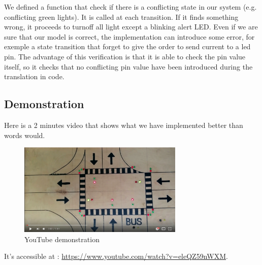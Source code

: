 We defined a function that check if there is a conflicting state in our system (e.g. conflicting green lights). It is called at each transition. If it finds something wrong, it proceeds to turnoff all light except a blinking alert LED.
Even if we are sure that our model is correct, the implementation can introduce some error, for exemple a state transition that forget to give the order to send current to a led pin.
The advantage of this verification is that it is able to check the pin value itself, so it checks that no conflicting pin value have been introduced during the translation in code. 


\subsection{Demonstration}

Here is a 2 minutes video that shows what we have implemented better than words would.

\begin{figure}[H]\label{fig:ytv}
  \centering
    \includegraphics[width=0.7\textwidth]{picture/demo.png}
    \caption{YouTube demonstration}
\end{figure}

It's accessible at :  \url{https://www.youtube.com/watch?v=eleQZ59nWXM}.
